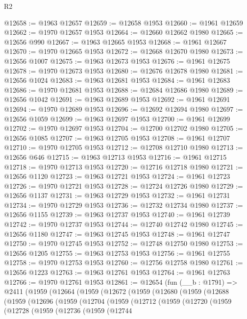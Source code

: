 \begin{lexlean}{R2}
\begin{coremodule}
@12658 := @1963 @12657
@12659 := @12658 @1953
@12660 := @1961 @12659
@12662 := @1970 @12657 @1953
@12664 := @12660 @12662 @1980
@12665 := @12656 @990
@12667 := @1963 @12665 @1953
@12668 := @1961 @12667
@12670 := @1970 @12665 @1953
@12672 := @12668 @12670 @1980
@12673 := @12656 @1007
@12675 := @1963 @12673 @1953
@12676 := @1961 @12675
@12678 := @1970 @12673 @1953
@12680 := @12676 @12678 @1980
@12681 := @12656 @1024
@12683 := @1963 @12681 @1953
@12684 := @1961 @12683
@12686 := @1970 @12681 @1953
@12688 := @12684 @12686 @1980
@12689 := @12656 @1042
@12691 := @1963 @12689 @1953
@12692 := @1961 @12691
@12694 := @1970 @12689 @1953
@12696 := @12692 @12694 @1980
@12697 := @12656 @1059
@12699 := @1963 @12697 @1953
@12700 := @1961 @12699
@12702 := @1970 @12697 @1953
@12704 := @12700 @12702 @1980
@12705 := @12656 @1085
@12707 := @1963 @12705 @1953
@12708 := @1961 @12707
@12710 := @1970 @12705 @1953
@12712 := @12708 @12710 @1980
@12713 := @12656 @646
@12715 := @1963 @12713 @1953
@12716 := @1961 @12715
@12718 := @1970 @12713 @1953
@12720 := @12716 @12718 @1980
@12721 := @12656 @1120
@12723 := @1963 @12721 @1953
@12724 := @1961 @12723
@12726 := @1970 @12721 @1953
@12728 := @12724 @12726 @1980
@12729 := @12656 @1137
@12731 := @1963 @12729 @1953
@12732 := @1961 @12731
@12734 := @1970 @12729 @1953
@12736 := @12732 @12734 @1980
@12737 := @12656 @1155
@12739 := @1963 @12737 @1953
@12740 := @1961 @12739
@12742 := @1970 @12737 @1953
@12744 := @12740 @12742 @1980
@12745 := @12656 @1180
@12747 := @1963 @12745 @1953
@12748 := @1961 @12747
@12750 := @1970 @12745 @1953
@12752 := @12748 @12750 @1980
@12753 := @12656 @1205
@12755 := @1963 @12753 @1953
@12756 := @1961 @12755
@12758 := @1970 @12753 @1953
@12760 := @12756 @12758 @1980
@12761 := @12656 @1223
@12763 := @1963 @12761 @1953
@12764 := @1961 @12763
@12766 := @1970 @12761 @1953
@12861 := @12654
    (fun (__b : @1791) =>
    @2411
      (@1959
        (@12664
          (@1959
            (@12672
              (@1959
                (@12680
                  (@1959
                    (@12688
                      (@1959
                        (@12696
                          (@1959
                            (@12704
                              (@1959
                                (@12712
                                  (@1959
                                    (@12720
                                      (@1959
                                        (@12728
                                          (@1959
                                            (@12736
                                              (@1959
                                                (@12744

\end{coremodule}
\end{lexlean}
